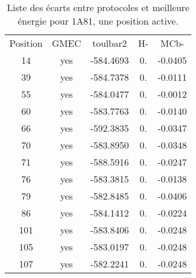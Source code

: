     \begin{table}[h]
      \centering

      \begin{tabular}{ccccc}


        \toprule
        Position & GMEC & toulbar2 & H- & MCb- \\
        \cmidrule{1-3}
        14  & yes & -584.4693 & 0. & -0.0405 \\
        39  & yes & -584.7378 & 0. & -0.0111 \\
        55  & yes & -584.0477 & 0. & -0.0012 \\
        60  & yes & -583.7763 & 0. & -0.0140 \\
        66  & yes & -592.3835 & 0. & -0.0347 \\
        70  & yes & -583.8950 & 0. & -0.0348 \\
        71  & yes & -588.5916 & 0. & -0.0247 \\
        76  & yes & -583.3815 & 0. & -0.0138 \\
        79  & yes & -582.8485 & 0. & -0.0406 \\
        86  & yes & -584.1412 & 0. & -0.0224 \\
        101 & yes & -583.8406 & 0. & -0.0248 \\
        105 & yes & -583.0197 & 0. & -0.0248 \\
        107 & yes & -582.2241 & 0. & -0.0248 \\

        \bottomrule

      \end{tabular}      
      \caption{Liste des écarts entre protocoles et meilleure énergie pour 1A81, une position active.
        \label{tab:result_1_active_1A81}}      
    \end{table}


